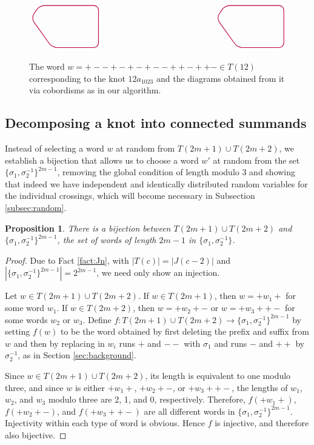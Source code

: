 \documentclass[12pt]{amsart}
\newtheorem{proposition}[theorem]{Proposition}
\theoremstyle{definition}
\theoremstyle{remark}
\numberwithin{equation}{section}
\begin{document}
\begin{figure}[h!]
\[\begin{tikzpicture}[scale=.7,thick]
\begin{scope}[yshift = -9cm, rounded corners = 2mm]
        \draw[rounded corners = 2mm, purple] (2,2.25) -- (1,2.25) -- (.5,1.5) -- (1.75,-.25) -- (4.5,-.25) -- (4.5,2.25) -- (2,2.25);
    \draw[rounded corners = 2mm, purple] (13,2.25) -- (12,2.25) -- (11.5,1.5) -- (12.75,-.25) -- (15.5,-.25) -- (15.5,2.25) -- (13,2.25);

\end{scope}


\end{tikzpicture}\]
\caption{The word $w=+--+-+-+--++-++- \in T(12)$ corresponding to the knot $12a_{1023}$ and the diagrams obtained from it via cobordisms as in our algorithm.}
\label{fig:CobEx}
\end{figure}

\subsection{Decomposing a knot into connected summands}
\label{subsec:newmodel}  
Instead of selecting a word $w$ at random from $T(2m+1)\cup T(2m+2)$, we establish a bijection that allows us to choose a word $w'$ at random from the set $ \{\sigma_1,\sigma_2^{-1}\}^{2m-1}$, removing the global condition of length modulo 3 and showing that indeed we have independent and identically distributed random variables for the individual crossings, which will become necessary in Subsection \ref{subsec:random}.







\begin{proposition}
\label{prop:bijection}    
There is a bijection between $T(2m+1)\cup T(2m+2)$ and $\{\sigma_1,\sigma_2^{-1}\}^{2m-1}$, the set of words of length $2m-1$ in $\{\sigma_1,\sigma_2^{-1}\}$.
\end{proposition}


\begin{proof}
Due to Fact \ref{fact:Jn}, with $|T(c)|=|J(c-2)|$ and $|\{\sigma_1,\sigma_2^{-1}\}^{2m-1}|=2^{2m-1}$, we need only show an injection.

Let $w\in T(2m+1)\cup T(2m+2)$. If $w\in T(2m+1)$, then $w=+w_1+$ for some word $w_1$. If $w\in T(2m+2)$, then $w=+w_2+-$ or $w=+w_3++-$ for some words $w_2$ or $w_3$. Define $f:T(2m+1)\cup T(2m+2)\to \{\sigma_1,\sigma_2^{-1}\}^{2m-1}$ by setting $f(w)$ to be the word obtained by first deleting the prefix and suffix from $w$ and then by replacing in $w_i$ runs $+$ and $--$ with $\sigma_1$ and runs $-$ and $++$ by $\sigma_2^{-1}$, as in Section \ref{sec:background}.

Since $w\in T(2m+1)\cup T(2m+2)$, its length is equivalent to one modulo three, and since $w$ is either $+w_1+$, $+w_2+-$, or $+w_3++-$, the lengths of $w_1$, $w_2$, and $w_3$ modulo three are 2, 1, and 0, respectively. Therefore, $f(+w_1+)$, $f(+w_2+-)$, and $f(+w_3++-)$ are all different words in $\{\sigma_1,\sigma_2^{-1}\}^{2m-1}$. Injectivity within each type of word is obvious.  Hence $f$ is injective, and therefore also bijective.
\end{proof}
\end{document}
